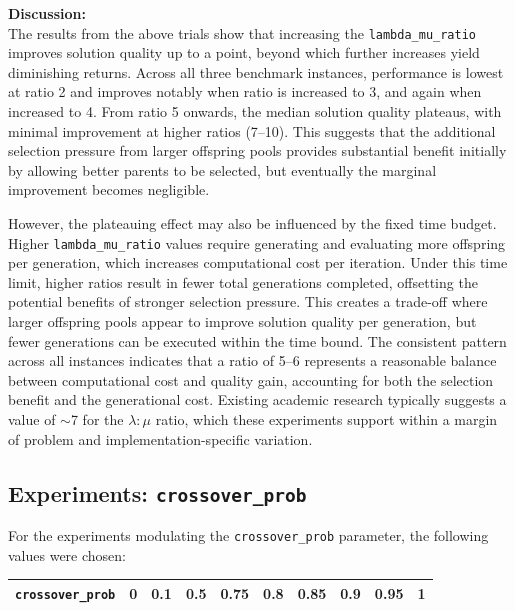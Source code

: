 \documentclass[11pt,a4paper]{article}
\begin{document}
\noindent \textbf{Discussion:} \\
The results from the above trials show that increasing the \texttt{lambda\_mu\_ratio} improves solution quality up to a point, beyond which further increases yield diminishing returns. Across all three benchmark instances, performance is lowest at ratio 2 and improves notably when ratio is increased to 3, and again when increased to 4. From ratio 5 onwards, the median solution quality plateaus, with minimal improvement at higher ratios (7--10). This suggests that the additional selection pressure from larger offspring pools provides substantial benefit initially by allowing better parents to be selected, but eventually the marginal improvement becomes negligible. 

However, the plateauing effect may also be influenced by the fixed time budget. Higher \texttt{lambda\_mu\_ratio} values require generating and evaluating more offspring per generation, which increases computational cost per iteration. Under this time limit, higher ratios result in fewer total generations completed, offsetting the potential benefits of stronger selection pressure. This creates a trade-off where larger offspring pools appear to improve solution quality per generation, but fewer generations can be executed within the time bound. The consistent pattern across all instances indicates that a ratio of 5--6 represents a reasonable balance between computational cost and quality gain, accounting for both the selection benefit and the generational cost. Existing academic research typically suggests a value of $\sim$7 for the $\lambda:\mu$ ratio, which these experiments support within a margin of problem and implementation-specific variation.

\subsection*{Experiments: \texttt{crossover\_prob}}

For the experiments modulating the \texttt{crossover\_prob} parameter, the following values were chosen:
\begin{flushleft}
  \begin{tabular}{|c|c|c|c|c|c|c|c|c|c|}
  \hline
  \textbf{\texttt{crossover\_prob}} & 0 & 0.1 & 0.5 & 0.75 & 0.8 & 0.85 & 0.9 & 0.95 & 1 \\
  \hline
  \end{tabular}
\end{flushleft}
\end{document}

